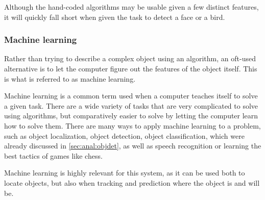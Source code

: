 Although the hand-coded algorithms may be usable given a few distinct features, it will quickly fall short when given the task to detect a face or a bird.

\subsubsection{Machine learning}\label{sec:obj_tracking:sub:ML}
Rather than trying to describe a complex object using an algorithm, an oft-used alternative is to let the computer figure out the features of the object itself.
This is what is referred to as machine learning.

Machine learning is a common term used when a computer teaches itself to solve a given task\cite{ArtificialIntelligencealanpoole}.
There are a wide variety of tasks that are very complicated to solve using algorithms, but comparatively easier to solve by letting the computer learn how to solve them. 
There are many ways to apply machine learning to a problem, such as object localization, object detection, object classification, which were already discussed in \autoref{sec:anal:objdet}, as well as speech recognition or learning the best tactics of games like chess.

Machine learning is highly relevant for this system, as it can be used both to locate objects, but also when tracking and prediction where the object is and will be.
